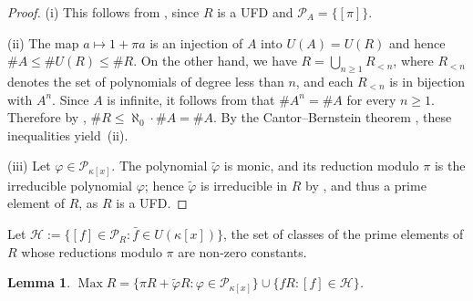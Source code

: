 \documentclass[12pt,reqno,a4paper]{amsart}
\newcommand{\Pe}{\mathcal{P}}
\DeclareMathOperator{\Max}{Max}
\theoremstyle{plain}
\newtheorem{lemma}[theorem]{Lemma}
\theoremstyle{definition}
\begin{document}
\begin{proof}
(i) This follows from \cite[Section~9.3, Corollary~6]{DummitFoote}, since $R$ is a UFD and $\Pe_A=\{[\pi]\}$.

(ii) The map $a\mapsto1+\pi a$ is an injection of $A$ into $U(A)=U(R)$ and hence $\#A\leq\#U(R)\leq\#R$. On the other hand, we have $R=\bigcup\limits_{n\geq1}R_{<n}$, where $R_{<n}$ denotes the set of polynomials of degree less than $n$, and each $R_{<n}$ is in bijection with $A^n$. Since $A$ is infinite, it follows from \cite[Theorem~3.5]{Jech} that $\#A^n=\#A$ for every $n\geq1$. Therefore by \cite[(3.14)]{Jech}, $\#R\leq\aleph_0\cdot\#A=\#A$. By the Cantor--Bernstein theorem \cite[Theorem~3.2]{Jech}, these inequalities yield~(ii).

(iii) Let $\varphi\in\Pe_{\kappa[x]}$. The polynomial $\tilde\varphi$ is monic, and its reduction modulo $\pi$ is the irreducible polynomial $\varphi$; hence $\tilde\varphi$ is irreducible in $R$ by \cite[Section~9.4, Proposition~12]{DummitFoote}, and thus a prime element of $R$, as $R$ is a UFD.
\end{proof}

Let $\mathcal{H}:=\{[f]\in\Pe_R:\bar f\in U(\kappa[x])\}$, the set of classes of the prime elements of $R$ whose reductions modulo $\pi$ are non-zero constants. 
\begin{lemma}\label{lem:max-AX}
$\Max R=\{\pi R+\tilde\varphi R:\varphi\in\Pe_{\kappa[x]}\}\cup\{fR:[f]\in\mathcal{H}\}$.
\end{lemma}
\end{document}
